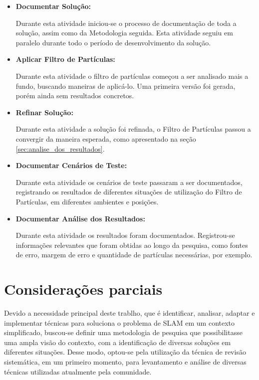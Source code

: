 \begin{itemize}
	\item \textbf{Documentar Solução:}

	Durante esta atividade iniciou-se o processo de documentação de toda a solução, assim como da Metodologia seguida. Esta atividade seguiu
	em paralelo durante todo o período de desenvolvimento da solução.

	\item \textbf{Aplicar Filtro de Partículas:}

	Durante esta atividade o filtro de partículas começou a ser analisado mais a fundo, buscando maneiras de aplicá-lo. Uma primeira versão
	foi gerada, porém ainda sem resultados concretos.

	\item \textbf{Refinar Solução:}

	Durante esta atividade a solução foi refinada, o Filtro de Partículas passou a convergir da maneira esperada, como apresentado na seção
	\ref{sec:analise_dos_resultados}.

	\item \textbf{Documentar Cenários de Teste:}

	Durante esta atividade os cenários de teste passaram a ser documentados, registrando os resultados de diferentes situações de utilização
	do Filtro de Partículas, em diferentes ambientes e posições.

	\item \textbf{Documentar Análise dos Resultados:}

	Durante esta atividade os resultados foram documentados. Registrou-se informações relevantes que foram obtidas ao longo da pesquisa, como
	fontes de erro, margem de erro e quantidade de partículas necessárias, por exemplo.

\end{itemize}

\section{Considerações parciais} %
\label{sec:considerações_parciais}

	Devido a necessidade principal deste trablho, que é identificar, analisar, adaptar e implementar técnicas para soluciona o problema de SLAM em um contexto simplificado, buscou-se definir uma metodologia de pesquisa que possibilitasse uma ampla visão do contexto, com a identificação de diversas soluções em diferentes situações. Desse modo, optou-se pela utilização da técnica de revisão sistemática, em um primeiro momento, para levantamento e análise de diversas técnicas utilizadas atualmente pela comunidade.

